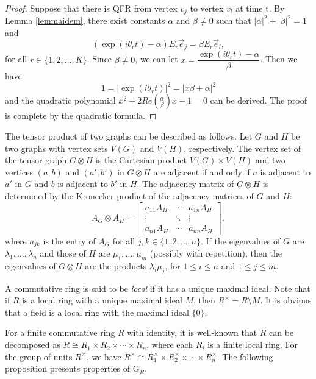 \documentclass[12pt]{amsart}
\numberwithin{equation}{section}
\theoremstyle{definition}
\theoremstyle{definition} \numberwithin{equation}{section}
\newcommand{\G}{\mathrm{G}}
\begin{document}
\begin{proof}
    Suppose that there is QFR from vertex $v_j$ to vertex $v_l$ at time t. By Lemma \ref{lemmaidem}, there exist constants $\alpha$ and $\beta \neq 0$ such that $|\alpha|^2 + |\beta|^2 = 1$ and
    $$
        (\exp{(i \theta_r t)} - \alpha ) E_r \vec{e}_j = \beta E_r \vec{e}_l,
    $$
     for all $r \in \{1, 2, \ldots, K\}$.
   Since $\beta \neq 0$, we can let $x = \dfrac{\exp{(i \theta_r t)} - \alpha}{\beta}$. Then we have 
   $$
   1 = |\exp{(i \theta_r t)}|^2 = |x\beta + \alpha|^2
   $$
   and the quadratic polynomial 
    $x^2 + 2 Re(\frac{\alpha}{\beta} )x  -1 = 0$ can be derived. The proof is complete by the quadratic formula. 
\end{proof}

\smallskip

The tensor product of two graphs can be described as follows. Let $G$ and $H$ be two graphs with vertex sets $V(G)$ and $V(H)$, respectively. The vertex set of the tensor graph $G \otimes H$ is the Cartesian product $V(G) \times V(H)$ and two vertices $(a, b)$ and $(a', b')$ in $G \otimes H$ are adjacent if and only if $a$ is adjacent to $a'$ in $G$ and $b$ is adjacent to $b'$ in $H$. The adjacency matrix of $G \otimes H$ is determined by the Kronecker product of the adjacency matrices of $G$ and $H$:
\begin{equation*}
   A_G \otimes A_H = \left [
            \begin{array}{ccc}
               a_{11} A_H & \cdots & a_{1n} A_H \\
\vdots & \ddots & \vdots \\
a_{n1} A_H & \cdots & a_{nn} A_H 
            \end{array}
            \right ],
\end{equation*}
where $a_{jk}$ is the entry of $A_G$ for all $j,k \in \{1,2,\ldots,n \}$. If the eigenvalues of $G$ are $\lambda_1, \ldots, \lambda_n$ and those of $H$ are $\mu_1, \ldots, \mu_m$ (possibly with repetition), then the eigenvalues of $G \otimes H$ are the products $\lambda_i \mu_j$, for $1 \leq i \leq n$ and $1 \leq j \leq m$.

A commutative ring is said to be {\it local} if it has a unique maximal ideal. Note that if $R$ is a local ring with a unique maximal ideal $M$, then $R^\times = R \setminus M$. It is obvious that a field is a local ring with the maximal ideal $\{0\}$.

For a finite commutative ring $R$ with identity, it is well-known that $R$ can be decomposed as $R \cong R_1 \times R_2 \times \cdots \times R_n$, where each $R_i$ is a finite local ring. For the group of units $R^\times$, we have 
$R^\times \cong R_1^\times \times R_2^\times \times \cdots \times R_n^\times$.
The following proposition presents properties of $\G_R$.
\end{document}
